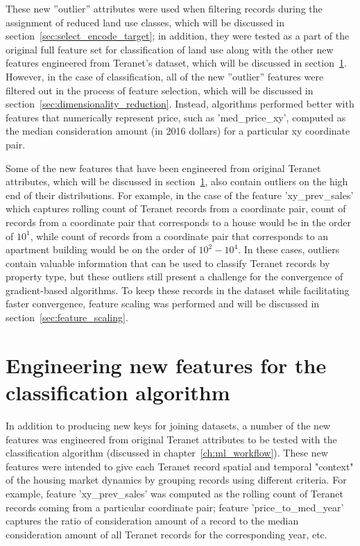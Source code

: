 These new ''outlier'' attributes were used when filtering records during the assignment of reduced land use classes, which will be discussed in section~\ref{sec:select_encode_target};
in addition, they were tested as a part of the original full feature set for classification of land use along with the other new features engineered from Teranet's dataset, which will be discussed in section~\ref{sec:feature_engineering}.
However, in the case of classification, all of the new ''outlier'' features were filtered out in the process of feature selection, which will be discussed in section~\ref{sec:dimensionality_reduction}.
Instead, algorithms performed better with features that numerically represent price, such as 'med\_price\_xy', computed as the median consideration amount (in 2016 dollars) for a particular xy coordinate pair.

Some of the new features that have been engineered from original Teranet attributes, which will be discussed in section~\ref{sec:feature_engineering}, also contain outliers on the high end of their distributions.
For example, in the case of the feature 'xy\_prev\_sales' which captures rolling count of Teranet records from a coordinate pair, count of records from a coordinate pair that corresponds to a house would be in the order of $10^1$, while count of records from a coordinate pair that corresponds to an apartment building would be on the order of $10^2-10^4$.
In these cases, outliers contain valuable information that can be used to classify Teranet records by property type, but these outliers still present a challenge for the convergence of gradient-based algorithms.
To keep these records in the dataset while facilitating faster convergence, feature scaling was performed and will be discussed in section~\ref{sec:feature_scaling}.

\section{Engineering new features for the classification algorithm} \label{sec:feature_engineering}

In addition to producing new keys for joining datasets, a number of the new features was engineered from original Teranet attributes to be tested with the classification algorithm (discussed in chapter~\ref{ch:ml_workflow}).
These new features were intended to give each Teranet record spatial and temporal "context" of the housing market dynamics by grouping records using different criteria.
For example, feature 'xy\_prev\_sales' was computed as the rolling count of Teranet records coming from a particular coordinate pair;
feature 'price\_to\_med\_year' captures the ratio of consideration amount of a record to the median consideration amount of all Teranet records for the corresponding year, etc.

